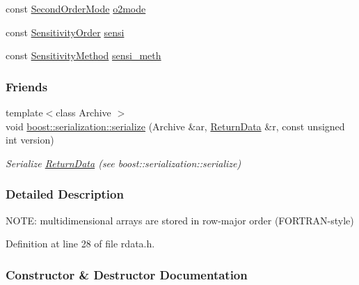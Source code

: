 \begin{DoxyCompactItemize}
\item 
const \mbox{\hyperlink{namespaceamici_a2d77779286167d5603a870bf9f6c21ba}{Second\+Order\+Mode}} \mbox{\hyperlink{classamici_1_1_return_data_acc235cad50283f7891e2d834f1cbeb90}{o2mode}}
\item 
const \mbox{\hyperlink{namespaceamici_aaa03ec2f8c4d5323b98d71134a462fda}{Sensitivity\+Order}} \mbox{\hyperlink{classamici_1_1_return_data_ae273fd99697cf0308e7471d822c22d7f}{sensi}}
\item 
const \mbox{\hyperlink{namespaceamici_aa0fa493529f6872e7e776b91fbbf38f9}{Sensitivity\+Method}} \mbox{\hyperlink{classamici_1_1_return_data_ab761d3023398d7f741a0cfc342dc29f5}{sensi\+\_\+meth}}
\end{DoxyCompactItemize}
\subsubsection*{Friends}
\begin{DoxyCompactItemize}
\item 
{\footnotesize template$<$class Archive $>$ }\\void \mbox{\hyperlink{classamici_1_1_return_data_af3646925990e46131d1bc92b5a7c0dc4}{boost\+::serialization\+::serialize}} (Archive \&ar, \mbox{\hyperlink{classamici_1_1_return_data}{Return\+Data}} \&r, const unsigned int version)
\begin{DoxyCompactList}\small\item\em Serialize \mbox{\hyperlink{classamici_1_1_return_data}{Return\+Data}} (see boost\+::serialization\+::serialize) \end{DoxyCompactList}\end{DoxyCompactItemize}


\subsubsection{Detailed Description}
N\+O\+TE\+: multidimensional arrays are stored in row-\/major order (F\+O\+R\+T\+R\+A\+N-\/style) 

Definition at line 28 of file rdata.\+h.



\subsubsection{Constructor \& Destructor Documentation}
\mbox{\label{classamici_1_1_return_data_a9fa947e466f4c7f55d36d1e81722abdc}} 
